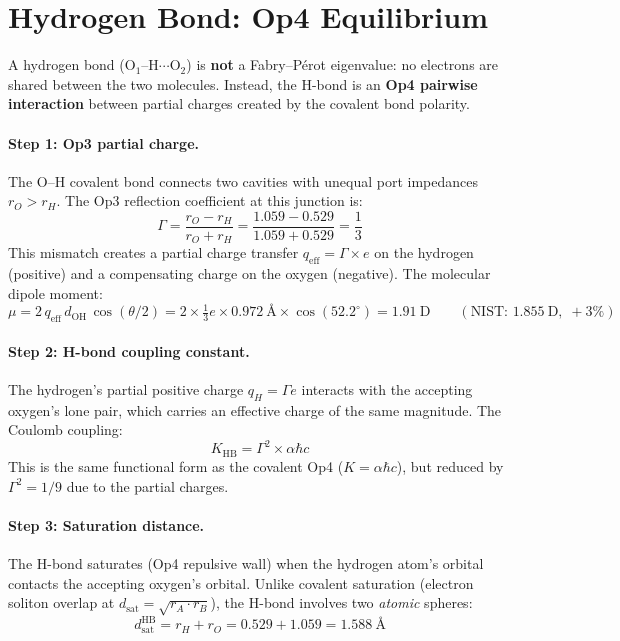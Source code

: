 \section{Hydrogen Bond: Op4 Equilibrium}
\label{sec:hbond_derivation}

A hydrogen bond (O$_1$--H$\cdots$O$_2$) is \textbf{not} a Fabry--P\'{e}rot eigenvalue: no electrons are shared between the two molecules. Instead, the H-bond is an \textbf{Op4 pairwise interaction} between partial charges created by the covalent bond polarity.

\paragraph{Step 1: Op3 partial charge.}
The O--H covalent bond connects two cavities with unequal port impedances $r_O > r_H$. The Op3 reflection coefficient at this junction is:
\begin{equation}
    \Gamma = \frac{r_O - r_H}{r_O + r_H} = \frac{1.059 - 0.529}{1.059 + 0.529} = \frac{1}{3}
    \label{eq:gamma_oh}
\end{equation}
This mismatch creates a partial charge transfer $q_\text{eff} = \Gamma \times e$ on the hydrogen (positive) and a compensating charge on the oxygen (negative). The molecular dipole moment:
\begin{equation}
    \mu = 2 \, q_\text{eff} \, d_\text{OH} \, \cos(\theta/2) = 2 \times \tfrac{1}{3}e \times 0.972~\text{\AA} \times \cos(52.2^\circ) = 1.91~\text{D}
    \qquad (\text{NIST: } 1.855~\text{D},\; +3\%)
    \label{eq:dipole}
\end{equation}

\paragraph{Step 2: H-bond coupling constant.}
The hydrogen's partial positive charge $q_H = \Gamma e$ interacts with the accepting oxygen's lone pair, which carries an effective charge of the same magnitude. The Coulomb coupling:
\begin{equation}
    K_\text{HB} = \Gamma^2 \times \alpha\hbar c
    \label{eq:K_hbond}
\end{equation}
This is the same functional form as the covalent Op4 ($K = \alpha\hbar c$), but reduced by $\Gamma^2 = 1/9$ due to the partial charges.

\paragraph{Step 3: Saturation distance.}
The H-bond saturates (Op4 repulsive wall) when the hydrogen atom's orbital contacts the accepting oxygen's orbital. Unlike covalent saturation (electron soliton overlap at $d_\text{sat} = \sqrt{r_A \cdot r_B}$), the H-bond involves two \emph{atomic} spheres:
\begin{equation}
    d_\text{sat}^\text{HB} = r_H + r_O = 0.529 + 1.059 = 1.588~\text{\AA}
    \label{eq:dsat_hbond}
\end{equation}

